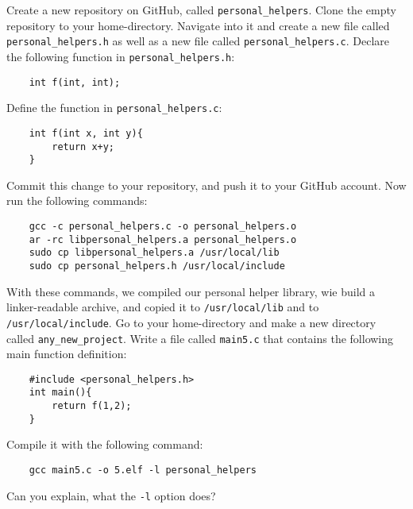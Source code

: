\documentclass{dcbl/challenge}
\begin{document}
\begin{aufgabe}
    Create a new repository on GitHub, called \texttt{personal\_helpers}.
    Clone the empty repository to your home-directory.
    Navigate into it and create a new file called \texttt{personal\_helpers.h} as well as a new file called \texttt{personal\_helpers.c}.
    Declare the following function in \texttt{personal\_helpers.h}:
    \begin{lstlisting}
    int f(int, int);
    \end{lstlisting}
    Define the function in \texttt{personal\_helpers.c}:
    \begin{lstlisting}
    int f(int x, int y){
        return x+y;
    }
    \end{lstlisting}
    Commit this change to your repository, and push it to your GitHub account.
    Now run the following commands:
    \begin{lstlisting}
    gcc -c personal_helpers.c -o personal_helpers.o
    ar -rc libpersonal_helpers.a personal_helpers.o
    sudo cp libpersonal_helpers.a /usr/local/lib
    sudo cp personal_helpers.h /usr/local/include
    \end{lstlisting}
    With these commands, we compiled our personal helper library, wie build a linker-readable archive, and copied it to \texttt{/usr/local/lib} and to \texttt{/usr/local/include}.
    Go to your home-directory and make a new directory called \texttt{any\_new\_project}.
    Write a file called \texttt{main5.c} that contains the following main function definition:
    \begin{lstlisting}
    #include <personal_helpers.h>
    int main(){
        return f(1,2);
    }
    \end{lstlisting}
    Compile it with the following command:
    \begin{lstlisting}
    gcc main5.c -o 5.elf -l personal_helpers
    \end{lstlisting}
    Can you explain, what the \texttt{-l} option does?
\end{aufgabe}
\end{document}
